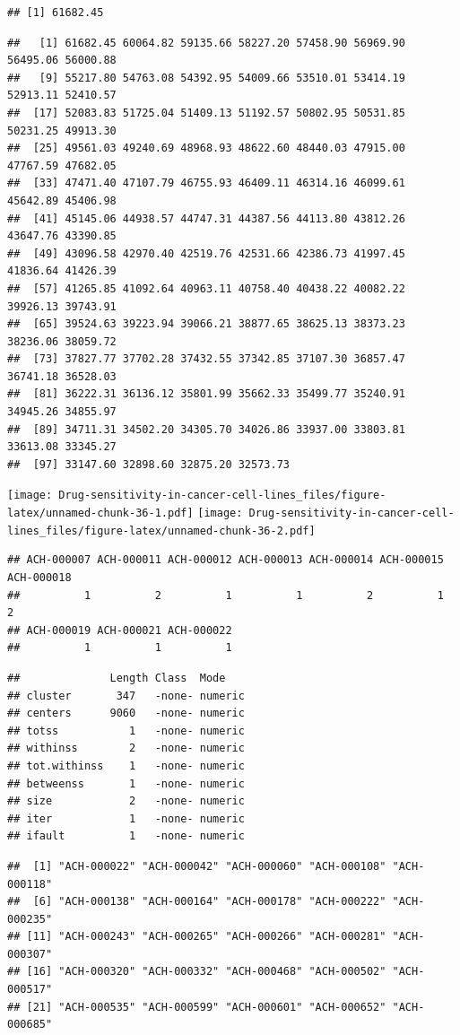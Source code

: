 \documentclass[
]{article}
\begin{document}
\begin{verbatim}
## [1] 61682.45
\end{verbatim}

\begin{verbatim}
##   [1] 61682.45 60064.82 59135.66 58227.20 57458.90 56969.90 56495.06 56000.88
##   [9] 55217.80 54763.08 54392.95 54009.66 53510.01 53414.19 52913.11 52410.57
##  [17] 52083.83 51725.04 51409.13 51192.57 50802.95 50531.85 50231.25 49913.30
##  [25] 49561.03 49240.69 48968.93 48622.60 48440.03 47915.00 47767.59 47682.05
##  [33] 47471.40 47107.79 46755.93 46409.11 46314.16 46099.61 45642.89 45406.98
##  [41] 45145.06 44938.57 44747.31 44387.56 44113.80 43812.26 43647.76 43390.85
##  [49] 43096.58 42970.40 42519.76 42531.66 42386.73 41997.45 41836.64 41426.39
##  [57] 41265.85 41092.64 40963.11 40758.40 40438.22 40082.22 39926.13 39743.91
##  [65] 39524.63 39223.94 39066.21 38877.65 38625.13 38373.23 38236.06 38059.72
##  [73] 37827.77 37702.28 37432.55 37342.85 37107.30 36857.47 36741.18 36528.03
##  [81] 36222.31 36136.12 35801.99 35662.33 35499.77 35240.91 34945.26 34855.97
##  [89] 34711.31 34502.20 34305.70 34026.86 33937.00 33803.81 33613.08 33345.27
##  [97] 33147.60 32898.60 32875.20 32573.73
\end{verbatim}

\texttt{[image: Drug-sensitivity-in-cancer-cell-lines\_files/figure-latex/unnamed-chunk-36-1.pdf]}
\texttt{[image: Drug-sensitivity-in-cancer-cell-lines\_files/figure-latex/unnamed-chunk-36-2.pdf]}

\begin{verbatim}
## ACH-000007 ACH-000011 ACH-000012 ACH-000013 ACH-000014 ACH-000015 ACH-000018 
##          1          2          1          1          2          1          2 
## ACH-000019 ACH-000021 ACH-000022 
##          1          1          1
\end{verbatim}

\begin{verbatim}
##              Length Class  Mode   
## cluster       347   -none- numeric
## centers      9060   -none- numeric
## totss           1   -none- numeric
## withinss        2   -none- numeric
## tot.withinss    1   -none- numeric
## betweenss       1   -none- numeric
## size            2   -none- numeric
## iter            1   -none- numeric
## ifault          1   -none- numeric
\end{verbatim}

\begin{verbatim}
##  [1] "ACH-000022" "ACH-000042" "ACH-000060" "ACH-000108" "ACH-000118"
##  [6] "ACH-000138" "ACH-000164" "ACH-000178" "ACH-000222" "ACH-000235"
## [11] "ACH-000243" "ACH-000265" "ACH-000266" "ACH-000281" "ACH-000307"
## [16] "ACH-000320" "ACH-000332" "ACH-000468" "ACH-000502" "ACH-000517"
## [21] "ACH-000535" "ACH-000599" "ACH-000601" "ACH-000652" "ACH-000685"
\end{verbatim}
\end{document}
